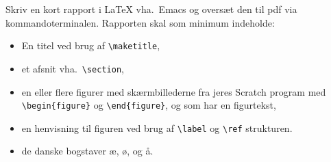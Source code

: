 Skriv en kort rapport i LaTeX vha.\ Emacs og oversæt den til pdf via kommandoterminalen. Rapporten skal som minimum indeholde:
  \begin{itemize}
  \item En titel ved brug af \verb|\maketitle|, 
  \item et afsnit vha.\ \verb|\section|,
  \item en eller flere figurer med skærmbillederne fra jeres Scratch
    program med \verb|\begin{figure}| og \verb|\end{figure}|, og som
    har en figurtekst,
  \item en henvisning til figuren ved brug af \verb|\label| og \verb|\ref| strukturen.
  \item de danske bogstaver æ, ø, og å.
  \end{itemize}

